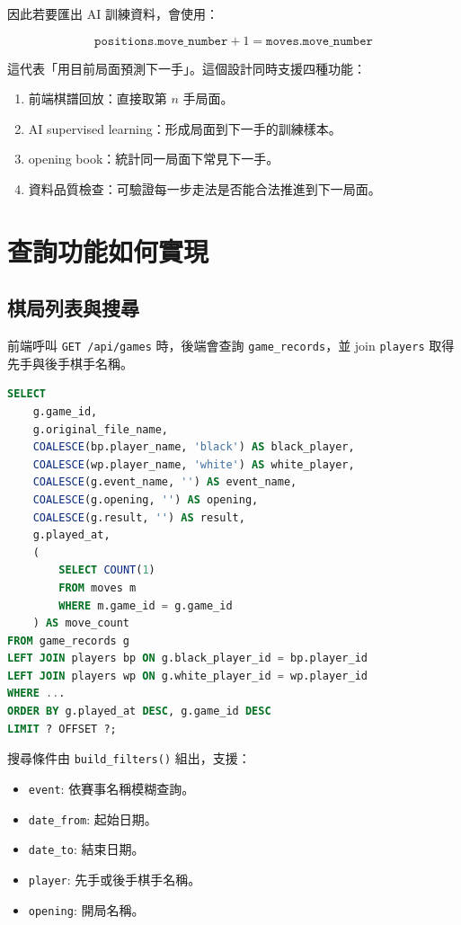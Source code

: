 \documentclass[12pt,a4paper,fontset=none]{ctexart}
\begin{document}
因此若要匯出 AI 訓練資料，會使用：

\[
\texttt{positions.move\_number} + 1 = \texttt{moves.move\_number}
\]

這代表「用目前局面預測下一手」。這個設計同時支援四種功能：

\begin{enumerate}
  \item 前端棋譜回放：直接取第 $n$ 手局面。
  \item AI supervised learning：形成局面到下一手的訓練樣本。
  \item opening book：統計同一局面下常見下一手。
  \item 資料品質檢查：可驗證每一步走法是否能合法推進到下一局面。
\end{enumerate}

\section{查詢功能如何實現}

\subsection{棋局列表與搜尋}

前端呼叫 \texttt{GET /api/games} 時，後端會查詢 \texttt{game\_records}，並 join \texttt{players} 取得先手與後手棋手名稱。

\begin{lstlisting}[style=sqlstyle,language=SQL]
SELECT
    g.game_id,
    g.original_file_name,
    COALESCE(bp.player_name, 'black') AS black_player,
    COALESCE(wp.player_name, 'white') AS white_player,
    COALESCE(g.event_name, '') AS event_name,
    COALESCE(g.opening, '') AS opening,
    COALESCE(g.result, '') AS result,
    g.played_at,
    (
        SELECT COUNT(1)
        FROM moves m
        WHERE m.game_id = g.game_id
    ) AS move_count
FROM game_records g
LEFT JOIN players bp ON g.black_player_id = bp.player_id
LEFT JOIN players wp ON g.white_player_id = wp.player_id
WHERE ...
ORDER BY g.played_at DESC, g.game_id DESC
LIMIT ? OFFSET ?;
\end{lstlisting}

搜尋條件由 \texttt{build\_filters()} 組出，支援：

\begin{itemize}
  \item \texttt{event}: 依賽事名稱模糊查詢。
  \item \texttt{date\_from}: 起始日期。
  \item \texttt{date\_to}: 結束日期。
  \item \texttt{player}: 先手或後手棋手名稱。
  \item \texttt{opening}: 開局名稱。
\end{itemize}
\end{document}
